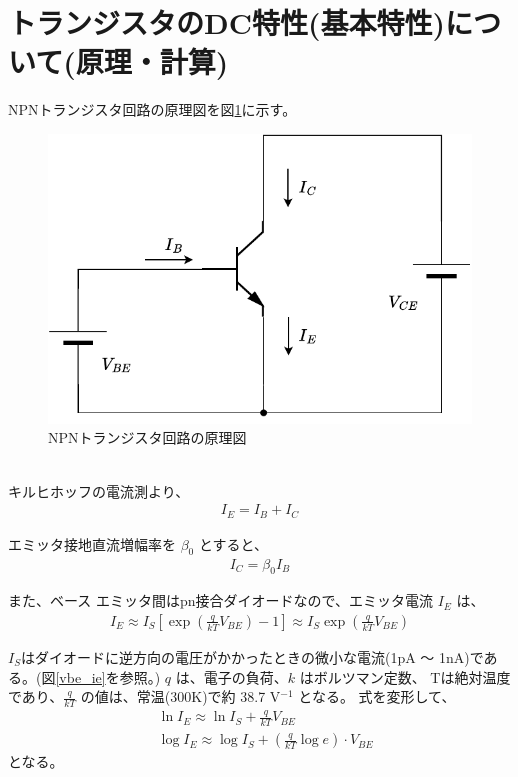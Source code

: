 \section{トランジスタのDC特性(基本特性)について(原理・計算)}
NPNトランジスタ回路の原理図を図\ref{npn_genri}に示す。
\begin{figure}[htbp]
  \begin{center}
  \includegraphics[width=0.5\linewidth]{img/24.pdf}
  \caption{NPNトランジスタ回路の原理図}
  \label{npn_genri}
  \end{center}
\end{figure}
\\キルヒホッフの電流測より、
\begin{align}
  I_E = I_B+I_C  
\end{align}

エミッタ接地直流増幅率を $\beta_0$ とすると、
\begin{align}
  I_C = \beta_0I_B  
\end{align}

また、ベース \- エミッタ間はpn接合ダイオードなので、エミッタ電流 $I_E$ は、
\begin{align}
  I_E \approx I_S\left[\exp\left(\frac{q}{kT}V_{BE}\right)-1\right]\approx I_S\exp\left(\frac{q}{kT}V_{BE}\right)  
\end{align}

$I_S$はダイオードに逆方向の電圧がかかったときの微小な電流(1pA ～ 1nA)である。(図\ref{vbe_ie}を参照。)
$q$ は、電子の負荷、$k$ はボルツマン定数、
Tは絶対温度であり、$\frac{q}{kT}$ の値は、常温(300K)で約 38.7 V$^{-1}$ となる。
式を変形して、
\begin{align}
  & \ln I_E \approx \ln I_S + \frac{q}{kT}V_{BE}\\
  & \log I_E \approx \log I_S + \left(\frac{q}{kT}\log e\right)\cdot V_{BE}
\end{align}
となる。